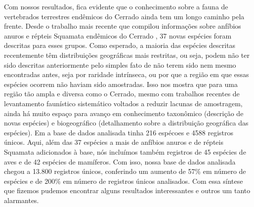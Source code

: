 \documentclass[12pt,openright,oneside,a4paper,english]{abntex2}
\begin{document}
Com nossos resultados, fica evidente que o conhecimento sobre a fauna de vertebrados terrestres endêmicos do Cerrado ainda tem um longo caminho pela frente. Desde o trabalho mais recente que compilou informações sobre anfíbios anuros e répteis Squamata endêmicos do Cerrado \citep{Azevedo2016}, 37 novas espécies foram descritas para esses grupos. Como esperado, a maioria das espécies descritas recentemente têm distribuições geográficas mais restritas, ou seja, podem não ter sido descritas anteriormente pelo simples fato de não terem sido nem mesmo encontradas antes, seja por raridade intrínseca, ou por que a região em que essas espécies ocorrem não haviam sido amostradas. Isso nos mostra que para uma região tão ampla e diversa como o Cerrado, mesmo com trabalhos recentes de levantamento faunístico sistemático voltados a reduzir lacunas de amostragem, ainda há muito espaço para avanço em conhecimento taxonômico (descrição de novas espécies) e biogeográfico (detalhamento sobre a distribuição geográfica das espécies). Em \citet{Azevedo2016} a base de dados analisada tinha 216 espécoes e 4588 registros únicos. Aqui, além das 37 espécies a mais de anfíbios anuros e de répteis Squamata adicionados à base, nós incluímos também registros de 45 espécies de aves e de 42 espécies de mamíferos. Com isso, nossa base de dados analisada chegou a 13.800 registros únicos, conferindo um aumento de 57\% em número de espécies e de 200\% em número de registros únicos analisados. Com essa síntese que fizemos pudemos encontrar alguns resultados interessantes e outros um tanto alarmantes.
\end{document}

